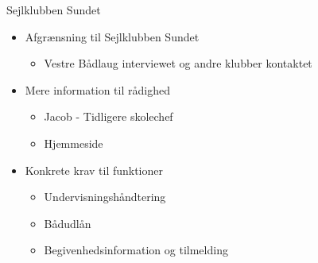 \begin{frame}{Sejlklubben Sundet}

	\begin{itemize}
	\item Afgrænsning til Sejlklubben Sundet
			\begin{itemize}
			\item Vestre Bådlaug interviewet og andre klubber kontaktet
			\end{itemize}
	\item Mere information til rådighed
			\begin{itemize}
			\item Jacob - Tidligere skolechef
			\item Hjemmeside
			\end{itemize} 
	\item Konkrete krav til funktioner
		\begin{itemize}
		\item Undervisningshåndtering
		\item Bådudlån
		\item Begivenhedsinformation og tilmelding
		\end{itemize}
	
	\end{itemize}
	
\end{frame}